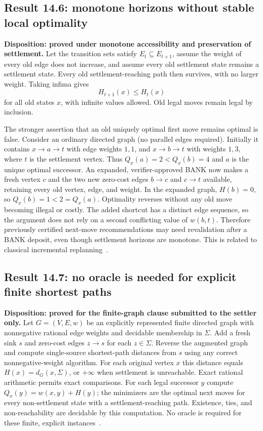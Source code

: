 \documentclass[11pt]{article}
\theoremstyle{definition}
\theoremstyle{remark}
\begin{document}
\subsection*{Result 14.6: monotone horizons without stable local optimality}
\label{sec:settle146}
\textbf{Disposition: proved under monotone accessibility and preservation of settlement.}
Let the transition sets satisfy $E_t\subseteq E_{t+1}$, assume the weight of every old edge does not increase, and assume every old settlement state remains a settlement state. Every old settlement-reaching path then survives, with no larger weight. Taking infima gives
\[
\boxed{H_{t+1}(x)\le H_t(x)}
\]
for all old states $x$, with infinite values allowed. Old legal moves remain legal by inclusion.

The stronger assertion that an old uniquely optimal first move remains optimal is false. Consider an ordinary directed graph (no parallel edges required). Initially it contains $x\to a\to t$ with edge weights $1,1$, and $x\to b\to t$ with weights $1,3$, where $t$ is the settlement vertex. Thus $Q_x(a)=2<Q_x(b)=4$ and $a$ is the unique optimal successor. An expanded, verifier-approved BANK now makes a fresh vertex $c$ and the two new zero-cost edges $b\to c$ and $c\to t$ available, retaining every old vertex, edge, and weight. In the expanded graph, $H(b)=0$, so $Q_x(b)=1<2=Q_x(a)$. Optimality reverses without any old move becoming illegal or costly. The added shortcut has a distinct edge sequence, so the argument does not rely on a second conflicting value of $w(b,t)$. Therefore previously certified next-move recommendations may need revalidation after a BANK deposit, even though settlement horizons are monotone. This is related to classical incremental replanning~\cite{dstar}.

\subsection*{Result 14.7: no oracle is needed for explicit finite shortest paths}
\label{sec:settle147}
\textbf{Disposition: proved for the finite-graph clause submitted to the settler only.}
Let $G=(V,E,w)$ be an explicitly represented finite directed graph with nonnegative rational edge weights and decidable membership in $\Sigma$. Add a fresh sink $s$ and zero-cost edges $z\to s$ for each $z\in\Sigma$. Reverse the augmented graph and compute single-source shortest-path distances from $s$ using any correct nonnegative-weight algorithm. For each original vertex $x$ this distance equals $H(x)=d_G(x,\Sigma)$, or $+\infty$ when settlement is unreachable. Exact rational arithmetic permits exact comparisons. For each legal successor $y$ compute $Q_x(y)=w(x,y)+H(y)$; the minimizers are the optimal next moves for every non-settlement state with a settlement-reaching path. Existence, ties, and non-reachability are decidable by this computation. No oracle is required for these finite, explicit instances~\cite{bellman,astar}.
\end{document}
